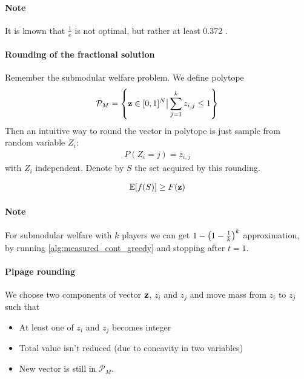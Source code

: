 \paragraph{Note} It is known that $\frac{1}{e}$ is not optimal, but rather at least $0.372$ \cite{ene2016constrained}.

\paragraph{Rounding of the fractional solution}
Remember the submodular welfare problem. We define polytope
\begin{align}
\mathcal{P}_M = \qty{ \vb{z} \in [0,1]^N \big\vert \sum_{j=1}^k z_{i,j} \leq 1}
\end{align}
Then an intuitive way to round the vector in polytope is just sample from random variable $Z_i$:
\begin{align}
P(Z_i= j) = z_{i,j}
\end{align}
with $Z_i$ independent. Denote by $S$ the set acquired by this rounding.
\begin{prop}
	\begin{align}
	\mathbb{E}\qty[f(S)] \geq F(\vb{z})
	\end{align}
\end{prop}

\paragraph{Note} For submodular welfare with $k$ players we can get $1-\qty(1-\frac{1}{k})^k$ approximation, by running \vref{alg:measured_cont_greedy} and stopping after $t=1$.


\paragraph{Pipage rounding}
We choose two components of vector $\vb{z}$, $z_i$ and $z_j$ and move mass from $z_i$ to $z_j$ such that
\begin{itemize}
	\item At least one of  $z_i$ and $z_j$ becomes integer
	\item Total value isn't reduced (due to concavity in two variables)
	\item New vector is still in $\mathcal{P}_M$. 
\end{itemize}